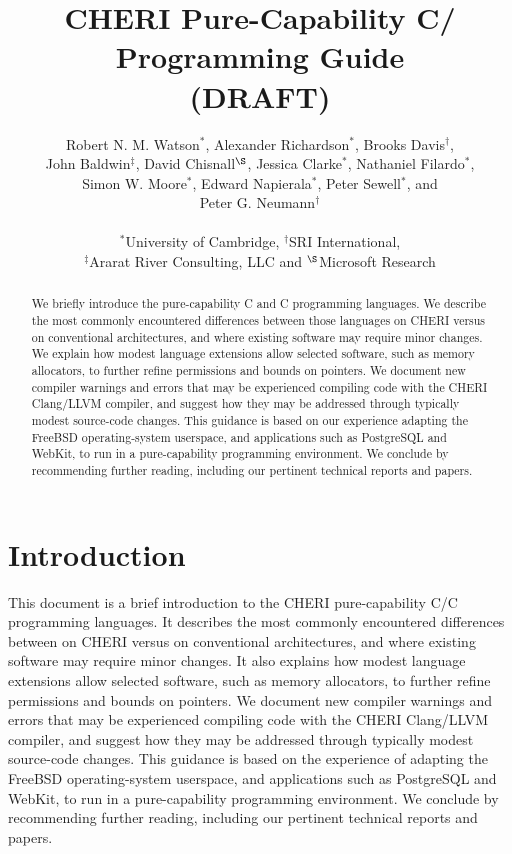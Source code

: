 \documentclass[12pt,twoside,openright,usletter]{article}
\title{CHERI Pure-Capability C/\cppInHeader{} Programming Guide \\ (DRAFT)}
\author{Robert N. M. Watson$^*$, Alexander Richardson$^*$,
  Brooks Davis$^\dagger$, \\
  John Baldwin$^\ddagger$, David Chisnall$^\S$, Jessica Clarke$^*$,
  Nathaniel Filardo$^*$, \\
  Simon W. Moore$^*$,  Edward Napierala$^*$, Peter Sewell$^*$, and \\
  Peter G. Neumann$^\dagger$ \\
  \\
  $^*$University of Cambridge, $^\dagger$SRI International, \\
  $^\ddagger$Ararat River Consulting, LLC and $^\S$Microsoft Research}
\newcommand{\note}[2]{{\color{blue}[ Note: #1 - #2]}}
\renewcommand{\note}[2]{\relax\ifhmode\unskip\fi}
\newcommand{\psnote}[1]{\note{#1}{Peter S.}}
\newcommand*{\cpp}[1][]{C\textsmaller[2]{\nolinebreak[4]\hspace{-.05em}\raisebox{.45ex}{\textbf{++}}}}
\newcommand*{\purecapCOrCpp}[1]{CHERI pure-capability C/\cpp{}}
\begin{document}
\sloppy

\maketitle


%
%
\begin{abstract}
We briefly introduce the pure-capability C and \cpp{} programming languages.
We describe the most commonly encountered differences between
%
those languages on CHERI versus on conventional architectures,
\psnote{that reads as ``differences between C and C++''.  Suggest:
  these CHERI dialects and conventional-architecture C and C++,
  }
and where existing software may
require minor changes.
We explain how modest language extensions allow selected software, such
as memory allocators, to further refine permissions and bounds on pointers.
We document new compiler warnings and errors that may be experienced compiling
code with the CHERI Clang/LLVM compiler, and suggest how they may be addressed
through typically modest source-code changes.
This guidance is based on our experience adapting the FreeBSD operating-system
userspace, and applications such as PostgreSQL and WebKit, to run in a
pure-capability programming environment.
We conclude by recommending further reading, including our pertinent technical
reports and papers.
\end{abstract}

\newpage
\setcounter{tocdepth}{2}
\tableofcontents

\newpage

\section{Introduction}

%
%
This document is a brief introduction to the \purecapCOrCpp{}
programming languages.
It describes the most commonly encountered differences between
on CHERI versus on conventional architectures,
\psnote{same here: that reads as ``differences between C and C++''.  Suggest:
  these CHERI dialects and conventional-architecture C and C++,
  }
and where existing software may
require minor changes.
It also explains how modest language extensions allow selected software, such
as memory allocators, to further refine permissions and bounds on pointers.
We document new compiler warnings and errors that may be experienced compiling
code with the CHERI Clang/LLVM compiler, and suggest how they may be addressed
through typically modest source-code changes.
This guidance is based on the experience of adapting the FreeBSD
operating-system userspace, and applications such as PostgreSQL and WebKit, to
run in a pure-capability programming environment.
We conclude by recommending further reading, including our pertinent technical
reports and papers.
\end{document}
